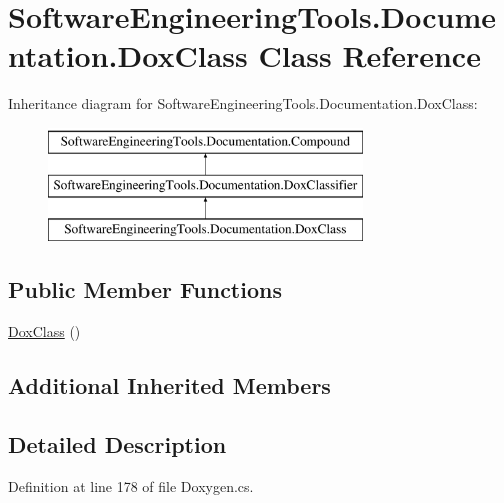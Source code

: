 \hypertarget{class_software_engineering_tools_1_1_documentation_1_1_dox_class}{\section{Software\+Engineering\+Tools.\+Documentation.\+Dox\+Class Class Reference}
\label{class_software_engineering_tools_1_1_documentation_1_1_dox_class}
}
Inheritance diagram for Software\+Engineering\+Tools.\+Documentation.\+Dox\+Class\+:\begin{figure}[H]
\begin{center}
\leavevmode
\includegraphics[height=3.000000cm]{class_software_engineering_tools_1_1_documentation_1_1_dox_class}
\end{center}
\end{figure}
\subsection*{Public Member Functions}
\begin{DoxyCompactItemize}
\item 
\hyperlink{class_software_engineering_tools_1_1_documentation_1_1_dox_class_a70d107ac98263b17e7e2bcbb48d8dc61}{Dox\+Class} ()
\end{DoxyCompactItemize}
\subsection*{Additional Inherited Members}


\subsection{Detailed Description}


Definition at line 178 of file Doxygen.\+cs.



